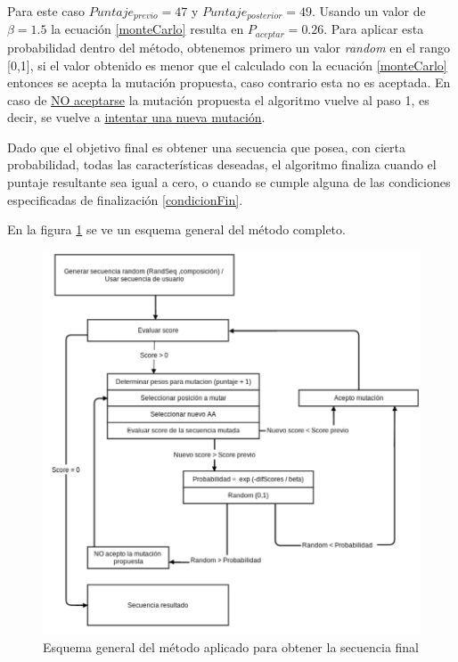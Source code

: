 \begin{enumerate}
    Para este caso $Puntaje_{previo}=47$ y $Puntaje_{posterior}=49$. Usando un valor de $\beta=1.5$ la ecuación \ref{monteCarlo} resulta en $P_{aceptar} = 0.26$.
    Para aplicar esta probabilidad dentro del método, obtenemos primero un valor \textit{random} en el rango [0,1], si el valor obtenido es menor que el calculado con la ecuación \ref{monteCarlo} entonces se acepta la mutación propuesta, 
    caso contrario esta no es aceptada. 
    En caso de \underline{NO aceptarse} la mutación propuesta el algoritmo vuelve al paso 1, es decir, se vuelve a \underline{intentar una nueva mutación}. 
        
\end{enumerate} 





Dado que el objetivo final es obtener una secuencia que posea, con cierta probabilidad, todas las características deseadas, 
el algoritmo finaliza cuando el puntaje resultante sea igual a cero, o cuando se cumple alguna de las condiciones especificadas de finalización \ref{condicionFin}. 


En la figura \ref{fig:esquema-algoritmo} se ve un esquema general del método completo.



\begin{figure}[ht]
\centering
   \includegraphics[width=\textwidth]{img/diagrama-algoritmo-2.png}
 \caption{Esquema general del método aplicado para obtener la secuencia final}
 \label{fig:esquema-algoritmo}
\end{figure}



